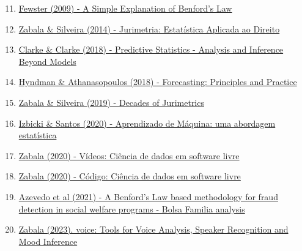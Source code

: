 \documentclass{beamer}\usepackage[]{graphicx}\usepackage[]{xcolor}
\begin{document}
\begin{frame}{\secname}
\fontsize{9pt}{9pt}\selectfont
  \begin{enumerate}
  \setcounter{enumi}{10}
  \itemsep.5em
  	\item \href{https://web.williams.edu/Mathematics/sjmiller/public_html/cmu/21-499/handouts/benford/Fewster_SimpleExplanationBenfordLaw.pdf}{Fewster (2009) - A Simple Explanation of Benford’s Law}
  	\item \href{https://ww2.esmarn.tjrn.jus.br/revistas/index.php/revista_direito_e_liberdade/article/view/732}{Zabala \& Silveira (2014) - Jurimetria: Estatística Aplicada ao Direito}
  	\item \href{https://doi.org/10.1017/9781139236003}{Clarke \& Clarke (2018) - Predictive Statistics - Analysis and Inference Beyond Models}
    \item \href{https://otexts.com/fpp2/}{Hyndman \& Athanasopoulos (2018) - Forecasting: Principles and Practice}
    \item \href{https://arxiv.org/abs/2001.00476}{Zabala \& Silveira (2019) - Decades of Jurimetrics}  
  	\item \href{http://www.rizbicki.ufscar.br/ame/}{Izbicki \& Santos (2020) - Aprendizado de Máquina: uma abordagem estatística}
    \item \href{https://www.youtube.com/@filipezabala}{Zabala (2020) - Vídeos: Ciência de dados em software livre}
  	\item \href{https://github.com/filipezabala/cddesl}{Zabala (2020) - Código: Ciência de dados em software livre}
  	\item \href{https://doi.org/10.1016/j.physa.2020.125626}{Azevedo et al (2021) - A Benford’s Law based methodology for fraud detection in social welfare programs - Bolsa Familia analysis}
  	\item \href{https://CRAN.R-project.org/package=voice}{Zabala (2023). voice: Tools for Voice Analysis, Speaker Recognition and Mood Inference}
	\end{enumerate}
\end{frame}
\end{document}
